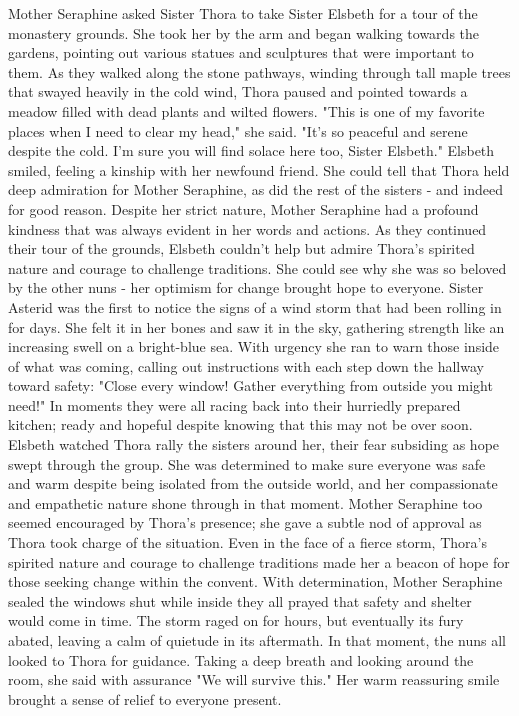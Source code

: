 \documentclass[11pt]{article}
\begin{document}
Mother Seraphine asked Sister Thora to take Sister Elsbeth for a tour of the monastery grounds. She took her by the arm and began walking towards the gardens, pointing out various statues and sculptures that were important to them. As they walked along the stone pathways, winding through tall maple trees that swayed heavily in the cold wind, Thora paused and pointed towards a meadow filled with dead plants and wilted flowers.
"This is one of my favorite places when I need to clear my head," she said. "It's so peaceful and serene despite the cold. I'm sure you will find solace here too, Sister Elsbeth."
Elsbeth smiled, feeling a kinship with her newfound friend. She could tell that Thora held deep admiration for Mother Seraphine, as did the rest of the sisters - and indeed for good reason. Despite her strict nature, Mother Seraphine had a profound kindness that was always evident in her words and actions. As they continued their tour of the grounds, Elsbeth couldn't help but admire Thora's spirited nature and courage to challenge traditions. She could see why she was so beloved by the other nuns - her optimism for change brought hope to everyone.
Sister Asterid was the first to notice the signs of a wind storm that had been rolling in for days. She felt it in her bones and saw it in the sky, gathering strength like an increasing swell on a bright-blue sea. With urgency she ran to warn those inside of what was coming, calling out instructions with each step down the hallway toward safety: "Close every window! Gather everything from outside you might need!"
In moments they were all racing back into their hurriedly prepared kitchen; ready and hopeful despite knowing that this may not be over soon. Elsbeth watched Thora rally the sisters around her, their fear subsiding as hope swept through the group. She was determined to make sure everyone was safe and warm despite being isolated from the outside world, and her compassionate and empathetic nature shone through in that moment. Mother Seraphine too seemed encouraged by Thora's presence; she gave a subtle nod of approval as Thora took charge of the situation. Even in the face of a fierce storm, Thora's spirited nature and courage to challenge traditions made her a beacon of hope for those seeking change within the convent. With determination, Mother Seraphine sealed the windows shut while inside they all prayed that safety and shelter would come in time.
The storm raged on for hours, but eventually its fury abated, leaving a calm of quietude in its aftermath. In that moment, the nuns all looked to Thora for guidance. Taking a deep breath and looking around the room, she said with assurance "We will survive this." Her warm reassuring smile brought a sense of relief to everyone present.
\end{document}
